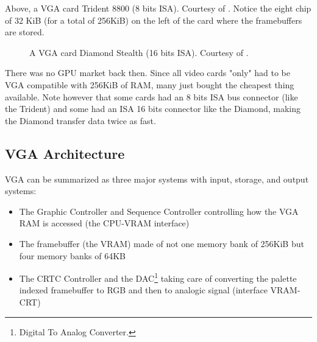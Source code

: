 \documentclass[book.tex]{subfiles}
\begin{document}
\begin{figure}[H] 
  \centering 
\end{figure}
\par
Above, a VGA card Trident 8800 (8 bits ISA). Courtesy of . Notice the eight chip of 32 KiB (for a total of 256KiB) on the left of the card where the framebuffers are stored.
\par
\begin{figure}[H] 
  \centering 
  \caption{A VGA card Diamond Stealth (16 bits ISA). Courtesy of .}
\end{figure}
 There was no GPU market back then. Since all video cards "only" had to be VGA compatible with 256KiB of RAM, many just bought the cheapest thing available. Note however that some cards had an 8 bits ISA bus connector (like the Trident) and some had an ISA 16 bits connector like the Diamond, making the Diamond transfer data twice as fast.\\
\par




\subsection{VGA Architecture}

VGA can be summarized as three major systems with input, storage, and output systems:\\

\begin{itemize}
\item The Graphic Controller and Sequence Controller controlling how the VGA RAM is accessed (the CPU-VRAM interface)
\item The framebuffer (the VRAM) made of not one memory bank of 256KiB but four memory banks of 64KB
\item The CRTC Controller and the DAC\footnote{Digital To Analog Converter.} taking care of converting the palette indexed framebuffer to RGB and then to analogic signal (interface VRAM-CRT)
\end{itemize}
\end{document}
